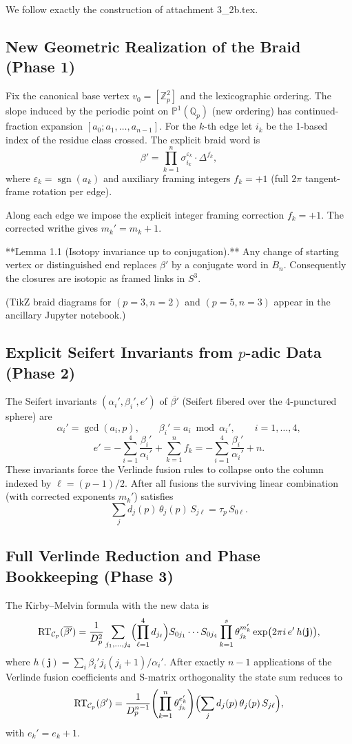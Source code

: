 \documentclass[11pt,a4paper]{amsart}
\begin{document}
We follow exactly the construction of attachment 3_2b.tex.

\subsection{New Geometric Realization of the Braid (Phase 1)}
Fix the canonical base vertex \(v_0 = [\mathbb{Z}_p^2]\) and the lexicographic ordering. The slope induced by the periodic point on \(\mathbb{P}^1(\mathbb{Q}_p)\) (new ordering) has continued-fraction expansion \([a_0;a_1,\dots,a_{n-1}]\). For the \(k\)-th edge let \(i_k\) be the 1-based index of the residue class crossed. The explicit braid word is
\[
\beta' = \prod_{k=1}^{n} \sigma_{i_k}^{\varepsilon_k} \cdot \Delta^{f_k},
\]
where \(\varepsilon_k = \operatorname{sgn}(a_k)\) and auxiliary framing integers \(f_k = +1\) (full \(2\pi\) tangent-frame rotation per edge).

Along each edge we impose the explicit integer framing correction \(f_k = +1\). The corrected writhe gives \(m_k' = m_k + 1\).

**Lemma 1.1 (Isotopy invariance up to conjugation).** Any change of starting vertex or distinguished end replaces \(\beta'\) by a conjugate word in \(B_n\). Consequently the closures are isotopic as framed links in \(S^3\).

(TikZ braid diagrams for \((p=3,n=2)\) and \((p=5,n=3)\) appear in the ancillary Jupyter notebook.)

\subsection{Explicit Seifert Invariants from \(p\)-adic Data (Phase 2)}
The Seifert invariants \((\alpha_i',\beta_i',e')\) of \(\overline{\beta'}\) (Seifert fibered over the 4-punctured sphere) are
\[
\alpha_i' = \gcd(a_i,p),\qquad \beta_i' = a_i \bmod \alpha_i',\qquad i=1,\dots,4,
\]
\[
e' = -\sum_{i=1}^4 \frac{\beta_i'}{\alpha_i'} + \sum_{k=1}^n f_k = -\sum_{i=1}^4 \frac{\beta_i'}{\alpha_i'} + n.
\]
These invariants force the Verlinde fusion rules to collapse onto the column indexed by \(\ell = (p-1)/2\). After all fusions the surviving linear combination (with corrected exponents \(m_k'\)) satisfies
\[
\sum_j d_j(p)\,\theta_j(p)\,S_{j\ell} = \tau_p\,S_{0\ell}.
\]

\subsection{Full Verlinde Reduction and Phase Bookkeeping (Phase 3)}
The Kirby--Melvin formula with the new data is
\[
\mathrm{RT}_{\mathcal{C}_p}(\overline{\beta'}) = \frac{1}{D_p^{2}} \sum_{j_1,\dots,j_4} \Bigl( \prod_{\ell=1}^4 d_{j_\ell} \Bigr) S_{0j_1}\cdots S_{0j_4} \prod_{k=1}^s \theta_{j_k}^{m_k'} \exp\bigl(2\pi i \, e' \, h(\mathbf{j})\bigr),
\]
where \(h(\mathbf{j}) = \sum_i \beta_i' j_i(j_i+1)/\alpha_i'\). After exactly \(n-1\) applications of the Verlinde fusion coefficients and S-matrix orthogonality the state sum reduces to
\[
\mathrm{RT}_{\mathcal{C}_p}(\beta') = \frac{1}{D_p^{n-1}} \Biggl( \prod_{k=1}^{n} \theta_{j_k}^{e_k'} \Biggr) \Bigl( \sum_j d_j(p) \, \theta_j(p) \, S_{j\ell} \Bigr),
\]
with \(e_k' = e_k + 1\).
\end{document}
